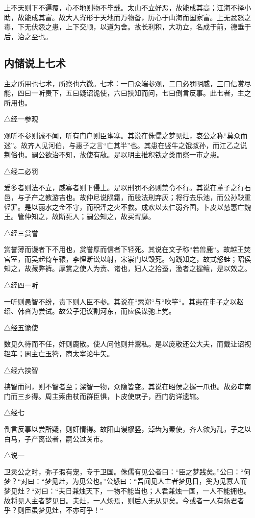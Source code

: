 \documentclass[]{article}
\begin{document}
上不天则下不遍覆，心不地则物不毕载。太山不立好恶，故能成其高；江海不择小助，故能成其富。故大人寄形于天地而万物备，历心于山海而国家富。上无忿怒之毒，下无伏怨之患，上下交顺，以道为舍。故长利积，大功立，名成于前，德垂于后，治之至也。

\hypertarget{header-n1097}{%
\subsection{内储说上七术}\label{header-n1097}}

主之所用也七术，所察也六微。七术：一曰众端参观，二曰必罚明威，三曰信赏尽能，四曰一听责下，五曰疑诏诡使，六曰挟知而问，七曰倒言反事。此七者，主之所用也。

△经一参观

观听不参则诚不闻，听有门户则臣壅塞。其说在侏儒之梦见灶，哀公之称``莫众而迷''。故齐人见河伯，与惠子之言``亡其半''也。其患在竖牛之饿叔孙，而江乙之说荆俗也。嗣公欲治不知，故使有敌。是以明主推积铁之类而察一市之患。

△经二必罚

爱多者则法不立，威寡者则下侵上。是以刑罚不必则禁令不行。其说在董子之行石邑，与子产之教游吉也。故仲尼说陨霜，而殷法刑弃灰；将行去乐池，而公孙鞅重轻罪。是以丽水之金不守，而积泽之火不救。成欢以太仁弱齐国，卜皮以慈惠亡魏王。管仲知之，故断死人；嗣公知之，故买胥靡。

△经三赏誉

赏誉薄而谩者下不用也，赏誉厚而信者下轻死。其说在文子称``若兽鹿``。故越王焚宫室，而吴起倚车辕，李悝断讼以射，宋崇门以毁死。勾践知之，故式怒蛙；昭侯知之，故藏弊裤。厚赏之使人为贲、诸也，妇人之拾蚕，渔者之握鳣，是以效之。

△经四一听

一听则愚智不纷，责下则人臣不参。其说在``索郑``与``吹竽``。其患在申子之以赵绍、韩沓为尝试。故公子汜议割河东，而应侯谋弛上党。

△经五诡使

数见久待而不任，奸则鹿散。使人问他则并鬻私。是以庞敬还公大夫，而戴让诏视辒车；周主亡玉簪，商太宰论牛矢。

△经六挟智

挟智而问，则不智者至；深智一物，众隐皆变。其说在昭侯之握一爪也。故必审南门而三乡得。周主索曲杖而群臣惧，卜皮使庶子，西门豹详遗辖。

△经七

倒言反事以尝所疑，则奸情得。故阳山谩樛竖，淖齿为秦使，齐人欲为乱，子之以白马，子产离讼者，嗣公过关市。

△说一

卫灵公之时，弥子瑕有宠，专于卫国。侏儒有见公者曰：``臣之梦践矣。''公曰：``何梦？``对曰：``梦见灶，为见公也。''公怒曰：``吾闻见人主者梦见日，奚为见寡人而梦见灶？``对曰：``夫日兼烛天下，一物不能当也；人君兼烛一国，一人不能拥也。故将见人主者梦见日。夫灶，一人炀焉，则后人无从见矣。今或者一人有炀君者乎？则臣虽梦见灶，不亦可乎！``
\end{document}
